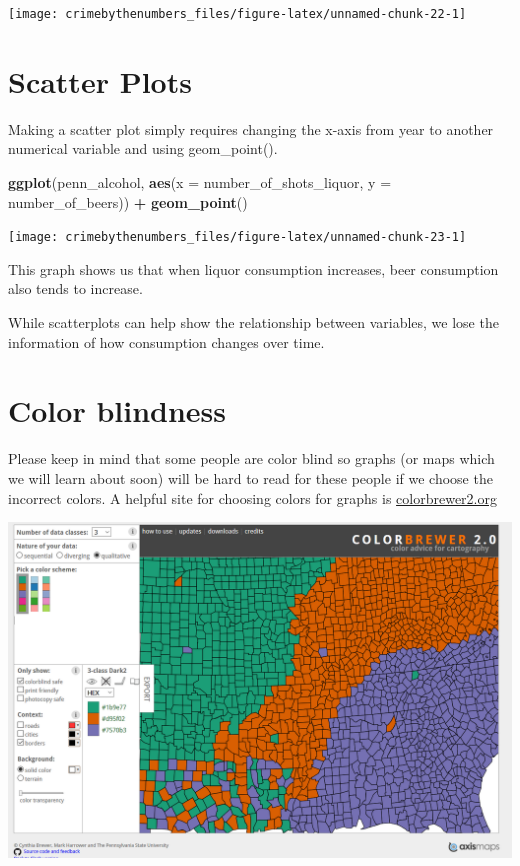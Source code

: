 \documentclass[
  12pt,
]{book}
\newenvironment{Shaded}{\begin{snugshade}}{\end{snugshade}}
\newcommand{\DataTypeTok}[1]{\textcolor[rgb]{0.27,0.27,0.27}{#1}}
\newcommand{\KeywordTok}[1]{\textcolor[rgb]{0.27,0.27,0.27}{\textbf{#1}}}
\newcommand{\NormalTok}[1]{#1}
\newcommand{\OperatorTok}[1]{\textcolor[rgb]{0.43,0.43,0.43}{\textbf{#1}}}
\newcommand{\StringTok}[1]{\textcolor[rgb]{0.5,0.5,0.5}{#1}}
\begin{document}
\begin{center}\texttt{[image: crimebythenumbers\_files/figure-latex/unnamed-chunk-22-1]} \end{center}

\hypertarget{scatter-plots}{%
\section{Scatter Plots}\label{scatter-plots}}

Making a scatter plot simply requires changing the x-axis from year to another numerical variable and using geom\_point().

\begin{Shaded}
\begin{Highlighting}[]
\KeywordTok{ggplot}\NormalTok{(penn\_alcohol, }\KeywordTok{aes}\NormalTok{(}\DataTypeTok{x =}\NormalTok{ number\_of\_shots\_liquor,}
                         \DataTypeTok{y =}\NormalTok{ number\_of\_beers)) }\OperatorTok{+}
\StringTok{  }\KeywordTok{geom\_point}\NormalTok{()}
\end{Highlighting}
\end{Shaded}

\begin{center}\texttt{[image: crimebythenumbers\_files/figure-latex/unnamed-chunk-23-1]} \end{center}

This graph shows us that when liquor consumption increases, beer consumption also tends to increase.

While scatterplots can help show the relationship between variables, we lose the information of how consumption changes over time.

\hypertarget{color-blindness}{%
\section{Color blindness}\label{color-blindness}}

Please keep in mind that some people are color blind so graphs (or maps which we will learn about soon) will be hard to read for these people if we choose the incorrect colors. A helpful site for choosing colors for graphs is \href{http://colorbrewer2.org}{colorbrewer2.org}

\includegraphics{images/colorbrewer.PNG}
\end{document}
